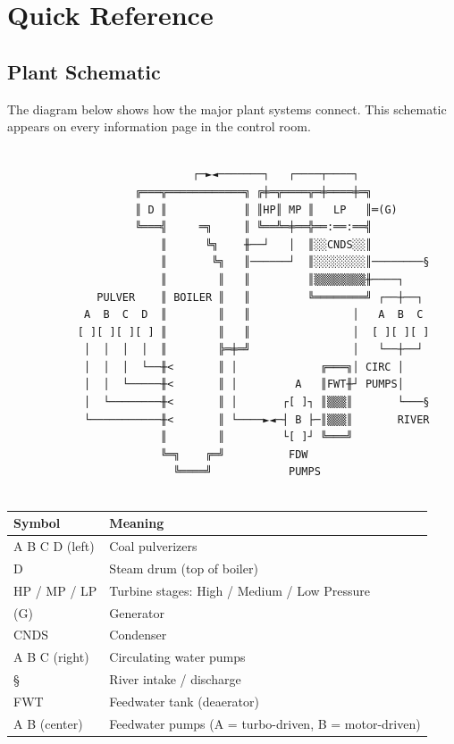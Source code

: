 \documentclass[10pt,a5paper]{article}
\begin{document}
\section{Quick Reference}

\subsection{Plant Schematic}

The diagram below shows how the major plant systems connect. This schematic
appears on every information page in the control room.

\begin{center}

\begin{Verbatim}

                             ┌─►◄───────┐   ┌────┬────┐
                    ╔═══╦════════════╗ ╔╪═╦════╦═╪════╪═╗
                    ║ D ║            ║ ║HP║ MP ║   LP   ║═(G)
                    ╚═══╣     ═╗     ║ ╚══╩═╪══╬══:══:══╣
                        ║      ╚╗    ╫──┘   │  ║░░CNDS░░║
                        ║       ╚╗   ║──────┘  ║░░░░░░░░║────────§
                        ║        ║   ║         ║▒▒▒▒▒▒▒▒╫────┐
              PULVER    ║ BOILER ║   ║         ╚════════╝ ┌──┼──┐
            A  B  C  D  ║        ║   ║                │   A  B  C
           [ ][ ][ ][ ] ║        ║   ║                │  [ ][ ][ ]
            │  │  │  │  ║        ╠═╪═╝                │   └──┼──┘
            │  │  │  └──╫<       ║ │             ╔═══╗│ CIRC │
            │  │  └─────╫<       ║ │         A   ║FWT╫┘ PUMPS│
            │  └────────╫<       ║ │       ┌[ ]┐ ║▒▒▒║       └───§
            └───────────╫<       ║ └────►◄─┤ B ├─║▒▒▒║       RIVER
                        ║        ║         └[ ]┘ ╚═══╝
                        ╚═╗    ╔═╝          FDW
                          ╚════╝            PUMPS
                          
\end{Verbatim}

\begin{tabular}{ll}
\toprule
\textbf{Symbol} & \textbf{Meaning} \\
\midrule
A B C D (left) & Coal pulverizers \\
D               & Steam drum (top of boiler) \\
HP / MP / LP    & Turbine stages: High / Medium / Low Pressure \\
(G)             & Generator \\
CNDS            & Condenser \\
A B C (right)   & Circulating water pumps \\
§               & River intake / discharge \\
FWT             & Feedwater tank (deaerator) \\
A B  (center)     & Feedwater pumps (A = turbo-driven, B = motor-driven) \\

\bottomrule
\end{tabular}
\end{center}
\end{document}
